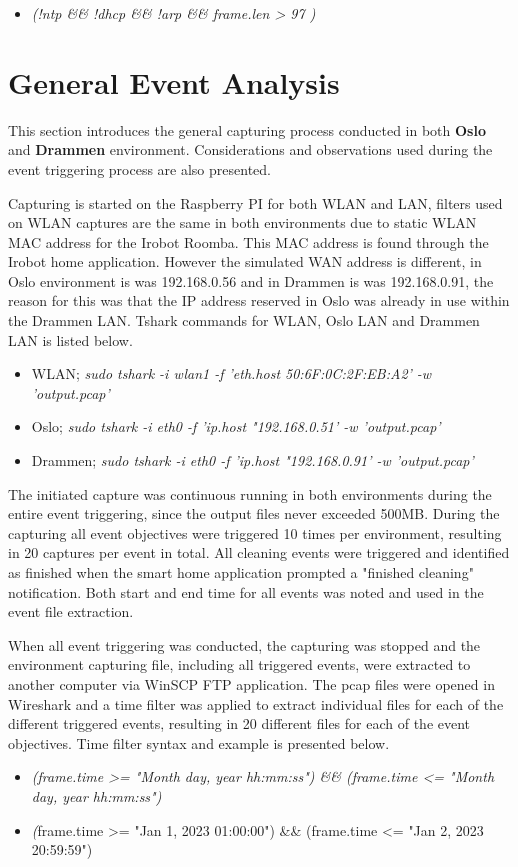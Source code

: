 \begin{itemize}
    \item \textit{(!ntp \&\& !dhcp \&\& !arp \&\& frame.len > 97 )}
\end{itemize}


\section{General Event Analysis}

 This section introduces the general capturing process conducted in both \textbf{Oslo} and \textbf{Drammen} environment. Considerations and observations used during the event triggering process are also presented. 

 Capturing is started on the Raspberry PI for both WLAN and LAN, filters used on WLAN captures are the same in both environments due to static WLAN MAC address for the Irobot Roomba. This MAC address is found through the Irobot home application. However the simulated WAN address is different, in Oslo environment is was 192.168.0.56 and in Drammen is was 192.168.0.91, the reason for this was that the IP address reserved in Oslo was already in use within the Drammen LAN. Tshark commands for WLAN, Oslo LAN and Drammen LAN is listed below. 

 \begin{itemize}
     \item WLAN; \textit{sudo tshark -i wlan1 -f 'eth.host 50:6F:0C:2F:EB:A2' -w 'output.pcap'}
     \item Oslo; \textit{sudo tshark -i eth0 -f 'ip.host "192.168.0.51' -w 'output.pcap'}
     \item Drammen; \textit{sudo tshark -i eth0 -f 'ip.host "192.168.0.91' -w 'output.pcap'}
 \end{itemize}

 The initiated capture was continuous running in both environments during the entire event triggering, since the output files never exceeded 500MB. During the capturing all event objectives were triggered 10 times per environment, resulting in 20 captures per event in total. All cleaning events were triggered and identified as finished when the smart home application prompted a "finished cleaning" notification. Both start and end time for all events was noted and used in the event file extraction. 

 When all event triggering was conducted, the capturing was stopped and the environment capturing file, including all triggered events, were extracted to another computer via WinSCP FTP application. The pcap files were opened in Wireshark and a time filter was applied to extract individual files for each of the different triggered events, resulting in 20 different files for each of the event objectives. Time filter syntax and example is presented below. 
 \begin{itemize}
     \item \textit{(frame.time >= "Month day, year hh:mm:ss") \&\& (frame.time <= "Month day, year hh:mm:ss") }
     \item \textit(frame.time >= "Jan 1, 2023 01:00:00") \&\& (frame.time <= "Jan 2, 2023 20:59:59") 
 \end{itemize}

